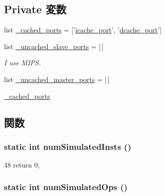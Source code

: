 \subsection*{Private 変数}
\begin{DoxyCompactItemize}
\item 
list \hyperlink{classBaseCPU_a57e86fee16346e0c872def95c935bfea}{\_\-cached\_\-ports} = \mbox{[}'\hyperlink{classBaseCPU_ada744b98d4371502b5cb7c4f036f1344}{icache\_\-port}', '\hyperlink{classBaseCPU_a9c199cadc0aca1c84868beea5d4402e7}{dcache\_\-port}'\mbox{]}
\item 
list \hyperlink{classBaseCPU_a84566b9e98570dae181d316412668254}{\_\-uncached\_\-slave\_\-ports} = \mbox{[}$\,$\mbox{]}
\begin{DoxyCompactList}\small\item\em I use MIPS. \item\end{DoxyCompactList}\item 
list \hyperlink{classBaseCPU_aa1ea0760d8eaf6d9205060618f4ba032}{\_\-uncached\_\-master\_\-ports} = \mbox{[}$\,$\mbox{]}
\item 
\hyperlink{classBaseCPU_a466be9cc0cce279e1a60edb036677ef9}{\_\-cached\_\-ports}
\end{DoxyCompactItemize}


\subsection{関数}
\hypertarget{classBaseCPU_a3dc27039752f525298c687220bcf26c2}{
\subsubsection[{numSimulatedInsts}]{\setlength{\rightskip}{0pt plus 5cm}static int numSimulatedInsts ()}}
\label{classBaseCPU_a3dc27039752f525298c687220bcf26c2}



\begin{DoxyCode}
48 { return 0; }
\end{DoxyCode}
\hypertarget{classBaseCPU_a24f07c8c3ace9a4eaf5679ae790106ea}{
\subsubsection[{numSimulatedOps}]{\setlength{\rightskip}{0pt plus 5cm}static int numSimulatedOps ()}}
\label{classBaseCPU_a24f07c8c3ace9a4eaf5679ae790106ea}



